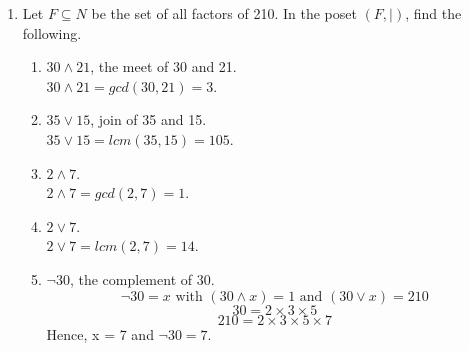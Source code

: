 \documentclass[12pt]{article}
\begin{document}
\begin{enumerate}
\begin{center}
  \end{center}
  \item Let $F \subseteq N$ be the set of all factors of 210. In the poset $(F, |)$, find the following.
  \begin{enumerate}
    \item $30 \wedge 21$, the meet of 30 and 21.\\
    $30 \wedge 21 = gcd(30,21) = 3$.
    \item $35 \vee 15$, join of 35 and 15.\\
    $35 \vee 15 = lcm(35,15) = 105$.
    \item $2 \wedge 7$.\\
    $2 \wedge 7 = gcd(2,7) = 1$.
    \item $2 \vee 7$.\\
    $2 \vee 7 = lcm(2,7) = 14$.
    \item $\neg 30$, the complement of 30.
    \[\neg 30 = x \text{ with } (30 \wedge x) = 1 \text{ and } (30 \vee x) = 210\]
    \[30 = 2\times3\times5\]
    \[210 = 2\times3\times5\times7\]
    Hence, x = 7 and $\neg 30 = 7$.
  \end{enumerate}

\end{enumerate}
\end{document}
